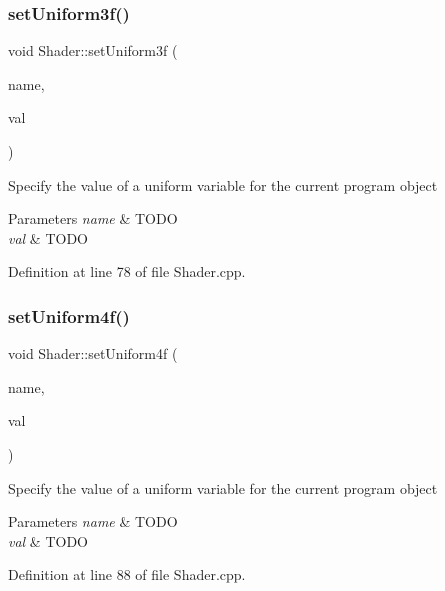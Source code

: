 \subsubsection{\texorpdfstring{set\+Uniform3f()}{setUniform3f()}}
{\footnotesize\ttfamily void Shader\+::set\+Uniform3f (\begin{DoxyParamCaption}\item[{const G\+Lchar $\ast$}]{name,  }\item[{const glm\+::vec3 \&}]{val }\end{DoxyParamCaption})}

Specify the value of a uniform variable for the current program object 
\begin{DoxyParams}{Parameters}
{\em name} & T\+O\+DO \\
\hline
{\em val} & T\+O\+DO \\
\hline
\end{DoxyParams}


Definition at line 78 of file Shader.\+cpp.

\mbox{\label{class_shader_a3ae217faa57e267bfd54fe91cd72b6ba}} 
\subsubsection{\texorpdfstring{set\+Uniform4f()}{setUniform4f()}}
{\footnotesize\ttfamily void Shader\+::set\+Uniform4f (\begin{DoxyParamCaption}\item[{const G\+Lchar $\ast$}]{name,  }\item[{const glm\+::vec4 \&}]{val }\end{DoxyParamCaption})}

Specify the value of a uniform variable for the current program object 
\begin{DoxyParams}{Parameters}
{\em name} & T\+O\+DO \\
\hline
{\em val} & T\+O\+DO \\
\hline
\end{DoxyParams}


Definition at line 88 of file Shader.\+cpp.

\mbox{\label{class_shader_a15647c94eb01764b51527eb00f85c9c3}} 
